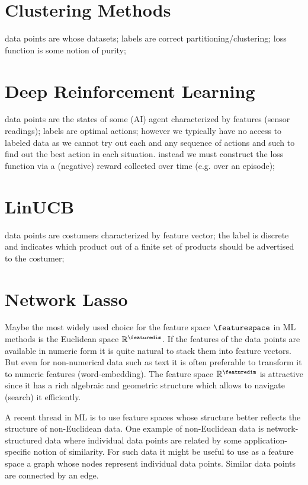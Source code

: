 \documentclass[12pt]{report}
\begin{document}
\section{Clustering Methods} 
\label{sec_clustering_methods} 
data points are whose datasets; labels are correct partitioning/clustering; loss function is some notion of purity; 


\section{Deep Reinforcement Learning}
\label{sec_reinflearning_methods}
data points are the states of some (AI) agent characterized by features (sensor readings); 
labels are optimal actions; however we typically have no access to labeled 
data as we cannot try out each and any sequence of actions and such to 
find out the best action in each situation. instead we must construct the 
loss function via a (negative) reward collected over time (e.g. over an episode); 

\section{LinUCB}
\label{sec_lin_ucb}
data points are costumers characterized by feature vector; the label is 
discrete and indicates which product out of a finite set of products should 
be advertised to the costumer; 

 
\section{Network Lasso} 
\label{sec_network_lasso}

Maybe the most widely used choice for the feature space $\featurespace$ in 
ML methods is the Euclidean space $\mathbb{R}^{\featuredim}$. If the features 
of the data points are available in numeric form it is quite natural to stack them 
into feature vectors. But even for non-numerical data such as text it is often 
preferable to transform it to numeric features (word-embedding). The feature 
space $\mathbb{R}^{\featuredim}$ is attractive since it has a rich algebraic and 
geometric structure which allows to navigate (search) it efficiently. 

A recent thread in ML is to use feature spaces whose structure better 
reflects the structure of non-Euclidean data. One example of non-Euclidean 
data is network-structured data where individual data points are related 
by some application-specific notion of similarity. For such data it might be useful 
to use as a feature space a graph whose nodes represent individual data points. 
Similar data points are connected by an edge. 
\end{document}
